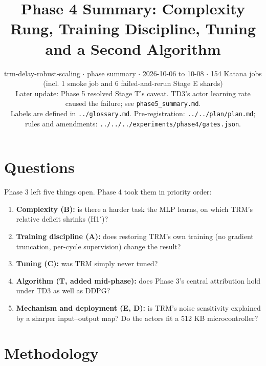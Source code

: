 \documentclass[11pt]{article}
\title{Phase 4 Summary: Complexity Rung, Training Discipline, Tuning and a Second Algorithm}
\author{}
\date{trm-delay-robust-scaling $\cdot$ phase summary $\cdot$ 2026-10-06 to 10-08 $\cdot$ 154 Katana jobs (incl. 1 smoke job and 6 failed-and-rerun Stage E shards)\\[2pt]Later update: Phase 5 resolved Stage T's caveat. TD3's actor learning rate caused the failure; see \texttt{phase5\_\allowbreak{}summary.\allowbreak{}md}.\\[2pt]Labels are defined in \texttt{.\allowbreak{}.\allowbreak{}/\allowbreak{}glossary.\allowbreak{}md}. Pre-registration: \texttt{.\allowbreak{}.\allowbreak{}/\allowbreak{}.\allowbreak{}.\allowbreak{}/\allowbreak{}plan/\allowbreak{}plan.\allowbreak{}md}; rules and amendments: \texttt{.\allowbreak{}.\allowbreak{}/\allowbreak{}.\allowbreak{}.\allowbreak{}/\allowbreak{}.\allowbreak{}.\allowbreak{}/\allowbreak{}experiments/\allowbreak{}phase4/\allowbreak{}gates.\allowbreak{}json}.}
\begin{document}
\maketitle
\section*{Questions}



Phase 3 left five things open. Phase 4 took them in priority order:



\begin{enumerate}
\item \textbf{Complexity (B):} is there a harder task the MLP learns, on which TRM's relative deficit shrinks (H1$'$)?
\item \textbf{Training discipline (A):} does restoring TRM's own training (no gradient truncation, per-cycle supervision) change the result?
\item \textbf{Tuning (C):} was TRM simply never tuned?
\item \textbf{Algorithm (T, added mid-phase):} does Phase 3's central attribution hold under TD3 as well as DDPG?
\item \textbf{Mechanism and deployment (E, D):} is TRM's noise sensitivity explained by a sharper input--output map? Do the actors fit a 512 KB microcontroller?
\end{enumerate}



\section*{Methodology}
\end{document}
